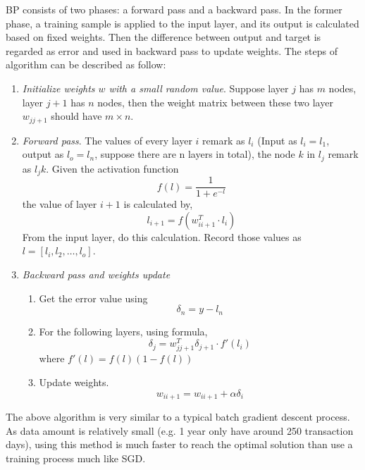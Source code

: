 BP consists of two phases: a forward pass and a backward pass. In the former phase, a training sample is applied to the input layer, and its output is calculated based on fixed weights. Then the difference between output and target is regarded as error and used in backward pass to update weights. The steps of algorithm can be described as follow\cite{nayak2014impact}:
\begin{enumerate}
	\item \textit{Initialize weights $ w $ with a small random value}. Suppose layer $ j $ has $ m $ nodes, layer $j + 1$ has $ n $ nodes, then the weight matrix between these two layer $ w_{jj+1} $ should have $ m \times n $.
	\item \textit{Forward pass}. The values of every layer $ i $ remark as $ l_i $ (Input as $ l_i =l_1 $, output as $l_o=l_n$, suppose there are n layers in total), the node $ k $ in $ l_j $ remark as $ l_jk $. Given the activation function
	\begin{equation}
	f(l) = \frac{1}{1+e^{-l}}
	\end{equation}
	the value of layer $ i + 1 $ is calculated by,
	\begin{equation}
	l_{i+1}=f(w_{ii+1}^T\cdot l_i)
	\end{equation}
	From the input layer, do this calculation. Record those values as $ l = [l_i, l_2, \ldots, l_o] $.
	\item \textit{Backward pass and weights update} 
	\begin{enumerate}
		\item Get the error value using
		\begin{equation}
		\delta_n = y - l_n
		\end{equation}
		
		\item For the following layers, using formula,
		\begin{equation}
		\delta_j = w_{jj+1}^T\delta_{j+1}\cdot f'(l_i)
		\end{equation}
		where $ f'(l) = f(l)(1-f(l)) $
		
		\item Update weights.
		\begin{equation}
		w_{ii+1} = w_{ii+1} + \alpha \delta_i 
		\end{equation}
	\end{enumerate}
\end{enumerate}

The above algorithm is very similar to a typical batch gradient descent process. As data amount is relatively small (e.g. 1 year only have around 250 transaction days), using this method is much faster to reach the optimal solution than use a training process much like SGD.

